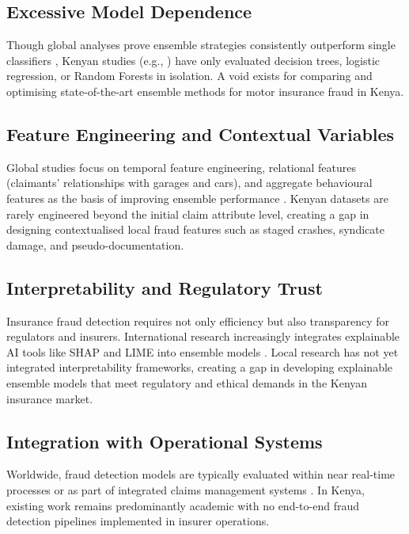 \documentclass[12pt,a4paper,oneside]{report}
\numberwithin{equation}{chapter}
\begin{document}
\subsection{Excessive Model Dependence}

Though global analyses prove ensemble strategies consistently outperform single classifiers
\cite{Ming2024}, Kenyan studies (e.g., \cite{njeru2022detection}) have only evaluated decision
trees, logistic regression, or Random Forests in isolation. A void exists for comparing and
optimising state-of-the-art ensemble methods for motor insurance fraud in Kenya.

\subsection{Feature Engineering and Contextual Variables}

Global studies focus on temporal feature engineering, relational features (claimants' relationships
with garages and cars), and aggregate behavioural features as the basis of improving ensemble
performance \cite{Scrivano2024,schrijver2024automobile}. Kenyan datasets are rarely engineered
beyond the initial claim attribute level, creating a gap in designing contextualised local fraud
features such as staged crashes, syndicate damage, and pseudo-documentation.

\subsection{Interpretability and Regulatory Trust}
\label{sec:interpretability-gap-lit}

Insurance fraud detection requires not only efficiency but also transparency for regulators and
insurers. International research increasingly integrates explainable AI tools like SHAP and LIME
into ensemble models \cite{Scrivano2024}. Local research has not yet integrated interpretability
frameworks, creating a gap in developing explainable ensemble models that meet regulatory and
ethical demands in the Kenyan insurance market.

\subsection{Integration with Operational Systems}

Worldwide, fraud detection models are typically evaluated within near real-time processes or as
part of integrated claims management systems \cite{Scrivano2024}. In Kenya, existing work remains
predominantly academic with no end-to-end fraud detection pipelines implemented in insurer
operations.
\end{document}
